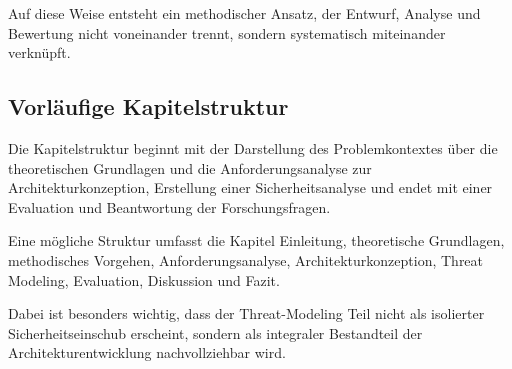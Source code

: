 Auf diese Weise entsteht ein methodischer Ansatz, der Entwurf, Analyse und Bewertung nicht voneinander trennt, sondern systematisch miteinander verknüpft.

\subsection{Vorläufige Kapitelstruktur}

Die Kapitelstruktur beginnt mit der Darstellung des Problemkontextes über die theoretischen Grundlagen und die Anforderungsanalyse zur Architekturkonzeption, Erstellung einer Sicherheitsanalyse und endet mit einer Evaluation und Beantwortung der Forschungsfragen.

Eine mögliche Struktur umfasst die Kapitel Einleitung, theoretische Grundlagen, methodisches Vorgehen, Anforderungsanalyse, Architekturkonzeption, Threat Modeling, Evaluation, Diskussion und Fazit.

Dabei ist besonders wichtig, dass der Threat-Modeling Teil nicht als isolierter Sicherheitseinschub erscheint, sondern als integraler Bestandteil der Architekturentwicklung nachvollziehbar wird.